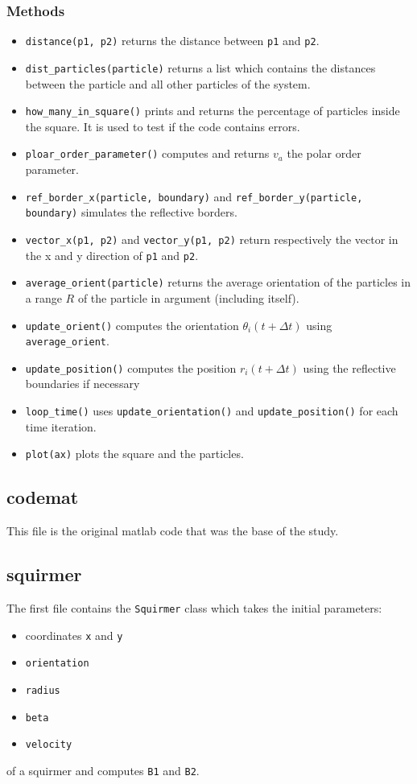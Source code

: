 \documentclass{article}
\begin{document}
\subsubsection*{Methods}
\begin{itemize}
    \item \texttt{distance(p1, p2)} returns the distance between \texttt{p1} and \texttt{p2}.
    \item \texttt{dist\_particles(particle)} returns a list which contains the distances between the particle and all other particles of the system.
    \item \texttt{how\_many\_in\_square()} prints and returns the percentage of particles inside the square. It is
    used to test if the code contains errors.
    \item \texttt{ploar\_order\_parameter()} computes and returns $v_a$ the polar order parameter.
    \item \texttt{ref\_border\_x(particle, boundary)} and \texttt{ref\_border\_y(particle, boundary)}
    simulates the reflective borders.
    \item \texttt{vector\_x(p1, p2)} and \texttt{vector\_y(p1, p2)} return respectively the vector in the x and y direction of \texttt{p1} and \texttt{p2}.
    \item \texttt{average\_orient(particle)} returns the average orientation of the particles in a range $R$ of the particle in argument (including itself).
    \item \texttt{update\_orient()} computes the orientation $\theta_i(t + \Delta t)$ using \texttt{average\_orient}.
    \item \texttt{update\_position()} computes the position $r_i(t + \Delta t)$ using the reflective boundaries if necessary
    \item \texttt{loop\_time()} uses \texttt{update\_orientation()} and \texttt{update\_position()} for each time iteration.
    \item \texttt{plot(ax)} plots the square and the particles.
\end{itemize}

\subsection{codemat}
This file is the original matlab code that was the base of the study.

\subsection{squirmer}
The first file contains the \texttt{Squirmer} class which takes the initial parameters: 
\begin{itemize}
   \item coordinates \texttt{x} and \texttt{y}
   \item \texttt{orientation}
   \item \texttt{radius}
   \item \texttt{beta}
   \item \texttt{velocity}
\end{itemize}
of a squirmer and computes \texttt{B1} and \texttt{B2}.
\end{document}
